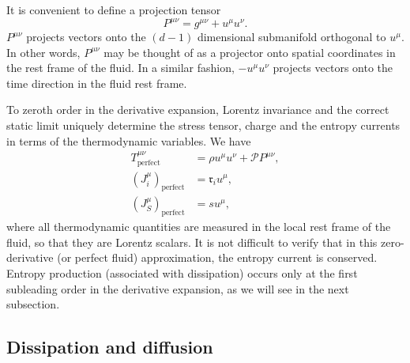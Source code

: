 \documentclass[12pt]{article}
\newcommand{\ploc}{\mathcal{P}}
\newcommand{\rl}{\mathfrak{r}}
\begin{document}
It is convenient to define a projection tensor
%
\begin{equation}\label{proj:eq}
  P^{\mu\nu} = g^{\mu\nu} + u^\mu u^\nu.
\end{equation}
%
$P^{\mu\nu}$ projects vectors onto the $(d-1)$ dimensional submanifold orthogonal to $u^\mu$. In other words, $P^{\mu\nu}$ may be thought of as a projector onto spatial coordinates in the rest frame of the fluid. In a similar fashion, $- u^\mu u^\nu$ projects vectors onto the time direction in the fluid rest frame.

To zeroth order in the derivative expansion, Lorentz invariance and the correct static limit uniquely determine the stress tensor, charge and the entropy currents in terms of the thermodynamic variables. We have
%
\begin{equation}\label{currents:eq}
\begin{split}
  T^{\mu\nu}_\mathrm{perfect}& = \rho u^\mu u^\nu + \ploc P^{\mu\nu}, \\
  (J^\mu_i)_\mathrm{perfect}&=\rl_iu^\mu, \\
  (J^\mu_S)_\mathrm{perfect}&=s u^\mu,
\end{split}
\end{equation}
%
where all thermodynamic quantities are measured in the local rest frame of the fluid, so that they are Lorentz scalars. It is not difficult to verify that in this zero-derivative (or perfect fluid) approximation, the entropy current is conserved. Entropy production (associated with dissipation) occurs only at the first subleading order in the derivative expansion, as we will see in the next subsection.

\subsection{Dissipation and diffusion}\label{sec:visc}
\end{document}
